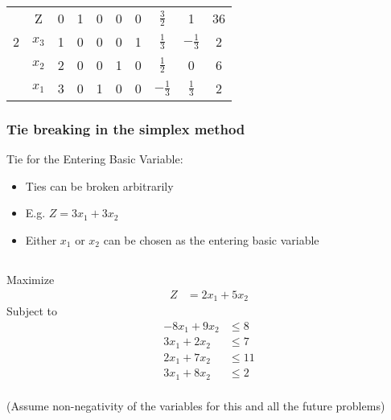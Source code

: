 \documentclass[12pt]{article}
\begin{document}
\begin{tabular}{cc|c|c|ccccc|c}
                           & Z         & 0                                    & 1 & 0                      & 0                       & 0     & $\frac{3}{2}$  & 1              & 36                      \\
                         2 & $x_3$     & 1                                    & 0 & 0                      & 0                       & 1     & $\frac{1}{3}$  & $-\frac{1}{3}$ & 2                       \\
                           & $x_2$     & 2                                    & 0 & 0                      & 1                       & 0     & $\frac{1}{2}$  & 0              & 6                       \\
                           & $x_1$     & 3                                    & 0 & 1                      & 0                       & 0     & $-\frac{1}{3}$ & $\frac{1}{3}$  & 2
\end{tabular}


  \subsubsection*{Tie breaking in the simplex method}
  Tie for the Entering Basic Variable:

  \begin{itemize}
  \item Ties can be broken arbitrarily
  \item E.g. $Z = 3 x_1 + 3 x_2$
  \item Either $x_1$ or $x_2$ can be chosen as the entering basic variable
  \end{itemize}

\subsection{}
Maximize
\begin{align*}
Z &= 2x_{1}+5x_{2}
\end{align*}
Subject to
\begin{align*}
-8x_{1}+9x_{2}& \le 8\\
3x_{1}+2x_{2}& \le 7\\
2x_{1}+7x_{2}& \le 11\\
3x_{1}+8x_{2}& \le 2\\
\end{align*}

(Assume non-negativity of the variables for this and all the future problems)
\end{document}
